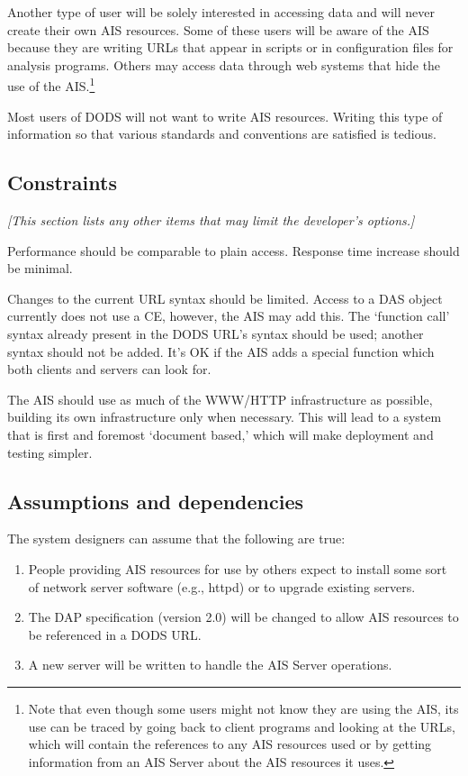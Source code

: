 \documentclass{article}
\begin{document}
Another type of user will be solely interested in accessing data and will
never create their own \ac{AIS} resources. Some of these users will be aware
of the \ac{AIS} because they are writing URLs that appear in scripts or in
configuration files for analysis programs. Others may access data through web
systems that hide the use of the \ac{AIS}.\footnote{Note that even though
  some users might not know they are using the \ac{AIS}, its use can be
  traced by going back to client programs and looking at the URLs, which will
  contain the references to any \ac{AIS} resources used \cbstart or by
  getting information from an \ac{AIS} Server about the \ac{AIS} resources it
  uses\cbend.}

Most users of \ac{DODS} will not want to write \ac{AIS} resources. Writing
this type of information so that various standards and conventions are
satisfied is tedious.

\subsection{Constraints}
\emph{[This section lists any other items that may limit the developer's
  options.]}

Performance should be comparable to plain access. Response time 
increase should be minimal. 

Changes to the current URL syntax should be limited. \cbstart Access to a
\ac{DAS} object currently does not use a \ac{CE}, however, the \ac{AIS} may
add this. The `function call' syntax already present in the DODS URL's syntax
should be used; another syntax should not be added. It's OK if the \ac{AIS}
adds a special function which both clients and servers can look for.\cbend

The AIS should use as much of the WWW/HTTP infrastructure as possible,
building its own infrastructure only when necessary. This will lead to a
system that is first and foremost `document based,' which will make
deployment and testing simpler.

\subsection{Assumptions and dependencies}
\label{sec:assumptions}
The system designers can assume that the following are true:
\begin{enumerate}
  
\item People providing \ac{AIS} resources for use by others expect to install
  some sort of network server software (e.g., httpd) \cbstart or to upgrade
  existing servers.\cbend

\item The \ac{DAP} specification (version 2.0) will be changed to allow
  \ac{AIS} resources to be referenced in a \ac{DODS} \ac{URL}.

\cbstart
\item A new server will be written to handle the \ac{AIS} Server operations.
\cbend
\end{enumerate}
\end{document}
